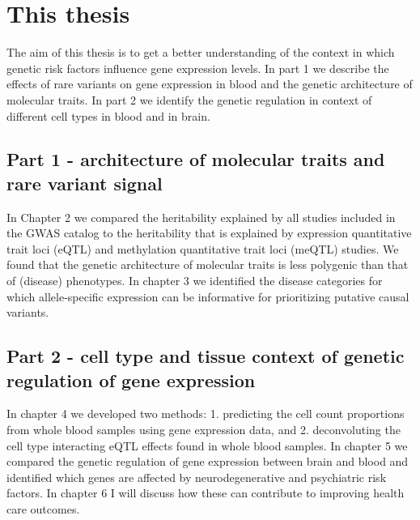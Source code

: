 \section{This thesis}
The aim of this thesis is to get a better understanding of the context in which genetic risk factors influence gene expression levels. In part 1 we describe the effects of rare variants on gene expression in blood and the genetic architecture of molecular traits. In part 2 we identify the genetic regulation in context of different cell types in blood and in brain.

\subsection{Part 1 - architecture of molecular traits and rare variant signal}
In Chapter 2 we compared the heritability explained by all studies included in the GWAS catalog\cite{bunielloNHGRIEBIGWASCatalog2019} to the heritability that is explained by expression quantitative trait loci (eQTL) and methylation quantitative trait loci (meQTL) studies. We found that the genetic architecture of molecular traits is less polygenic than that of (disease) phenotypes. In chapter 3 we identified the disease categories for which allele-specific expression can be informative for prioritizing putative causal variants.

\subsection{Part 2 - cell type and tissue context of genetic regulation of gene expression}
In chapter 4 we developed two methods: 1. predicting the cell count proportions from whole blood samples using gene expression data, and 2. deconvoluting the cell type interacting eQTL effects found in whole blood samples. In chapter 5 we compared the genetic regulation of gene expression between brain and blood and identified which genes are affected by neurodegenerative and psychiatric risk factors. In chapter 6 I will discuss how these can contribute to improving health care outcomes.







